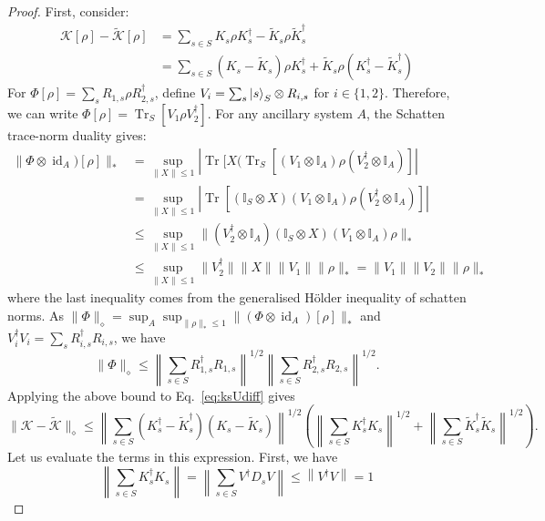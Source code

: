 \documentclass[aps,floatfix,10pt,amssymb,amsfont,amsmath,superscriptaddress,float,nofootinbib,longbibliography,nobalancelastpage,twocolumn]{revtex4-2}
\begin{document}
\begin{proof}
First, consider:
\begin{align}
    \mathcal{K}[\rho] - \tilde{\mathcal{K}}[\rho] &= \sum_{s \in S} K_s\rho K_s^{\dagger} - \tilde K_s\rho \tilde K_s^{\dagger} \\
    &= \sum_{s \in S} (K_s-\tilde K_s)\rho K_s^{\dagger} +\tilde K_s\rho (K_s^{\dagger}- \tilde K_s^{\dagger}) \label{eq:ksUdiff}
\end{align}
For $\Phi[\rho]=\sum_sR_{1,s}\rho R_{2,s}^\dagger$, define $V_i=\sum_s\ket{s}_S\otimes R_{i,s}$ for $i \in \{1,2\}$. Therefore, we can write $\Phi[\rho] = \operatorname{Tr}_S[V_1\rho V_2^{\dagger}]$. For any ancillary system $A$, the Schatten trace-norm duality gives:
\begin{align}
    \|\Phi\otimes\operatorname{id}_A)[\rho]\|_* &= \sup_{\|X\|\leq 1} | \operatorname{Tr}[X (\operatorname{Tr}_S[(V_1\otimes \mathbb{I}_A) \rho (V_2^{\dagger}\otimes \mathbb{I}_A)]|\\
    &=\sup_{\|X\|\leq 1} | \operatorname{Tr}[(\mathbb{I}_S \otimes X ) (V_1\otimes \mathbb{I}_A) \rho (V_2^{\dagger}\otimes \mathbb{I}_A)]|\\
    &\leq\sup_{\|X\|\leq 1} \| (V_2^{\dagger}\otimes \mathbb{I}_A)(\mathbb{I}_S \otimes X ) (V_1\otimes \mathbb{I}_A) \rho \|_*\\
    &\leq \sup_{\|X\|\leq 1} \| V_2^{\dagger}\|\|X\| \|V_1\| \| \rho \|_* = \|V_1\|\| V_2\| \| \rho \|_*
\end{align}
where the last inequality comes from the generalised H\"older inequality of schatten norms. As $\|\Phi\|_{\diamond} = \sup_A\sup_{\|\rho\|_*\leq 1}\|(\Phi\otimes\operatorname{id}_A)[\rho]\|_*$ and
\(V_i^\dagger V_i=\sum_sR_{i,s}^\dagger R_{i,s}\), we have
\begin{equation}
\|\Phi\|_\diamond
\leq
\left\|\sum_{s\in S}R_{1,s}^\dagger R_{1,s}\right\|^{1/2}
\left\|\sum_{s\in S}R_{2,s}^\dagger R_{2,s}\right\|^{1/2}.
\end{equation}
Applying the above bound to Eq.~\eqref{eq:ksUdiff}
gives
\begin{equation}
\|\mathcal{K}-\tilde{\mathcal{K}}\|_\diamond
\leq
\left\|\sum_{s\in S}(K_s^\dagger - \tilde K_s^\dagger)(K_s - \tilde K_s)\right\|^{1/2}
\left(
\left\|\sum_{s\in S}K_s^\dagger K_s\right\|^{1/2}
+
\left\|\sum_{s\in S}\tilde K_s^\dagger\tilde K_s\right\|^{1/2}
\right).
\label{eq:row-column-bound}
\end{equation}
Let us evaluate the terms in this expression. First, we have
\begin{equation}
     \left\|\sum_{s\in S} K_s^{\dagger}  K_s \right\| = \left\|\sum_{s\in S}  V^{\dagger}D_sV \right\| \leq  \left\|V^{\dagger} V\right\| = 1
\end{equation}


\end{proof}
\end{document}

